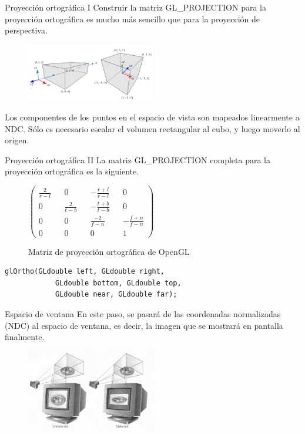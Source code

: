 \documentclass{beamer}
\begin{document}
\begin{frame}{Proyección ortográfica I}
  Construir la matriz GL\_PROJECTION para la proyección ortográfica es mucho más sencillo que para la proyección de perspectiva.
  \begin{figure}[h]
    \centering
    \includegraphics[width=0.5\textwidth]{img/gl_projectionmatrix02}
  \end{figure}
  Los componentes de los puntos en el espacio de vista son mapeados linearmente a NDC. Sólo es necesario escalar el volumen rectangular al cubo, y luego moverlo al origen.
\end{frame}
\begin{frame}[fragile]{Proyección ortográfica II}
  La matriz GL\_PROJECTION completa para la proyección ortográfica es la siguiente.
  \begin{figure} [h!]
  \(
  \begin{pmatrix}
    \frac{2}{r-l} &&             0 && - \frac{r+l}{r-l} &&                0 \\
                0 && \frac{2}{t-b} && - \frac{t+b}{t-b} &&                0 \\
                0 &&             0 &&    \frac{-2}{f-n} && -\frac{f+n}{f-n} \\
                0 &&             0 &&                  0 &&                1
  \end{pmatrix}
  \)
  \caption*{Matriz de proyección ortográfica de OpenGL}
\end{figure}
  \begin{lstlisting}[xleftmargin=10pt]
    glOrtho(GLdouble left, GLdouble right,
            GLdouble bottom, GLdouble top,
            GLdouble near, GLdouble far);
  \end{lstlisting}

\end{frame}


\begin{frame}{Espacio de ventana}
  En este paso, se pasará de las coordenadas normalizadas (NDC) al espacio de ventana, es decir, la imagen que se mostrará en pantalla finalmente.
  \begin{figure}[h]
    \centering
    \includegraphics[width=0.5\textwidth]{img/viewport}
  \end{figure}
\end{frame}
\end{document}
